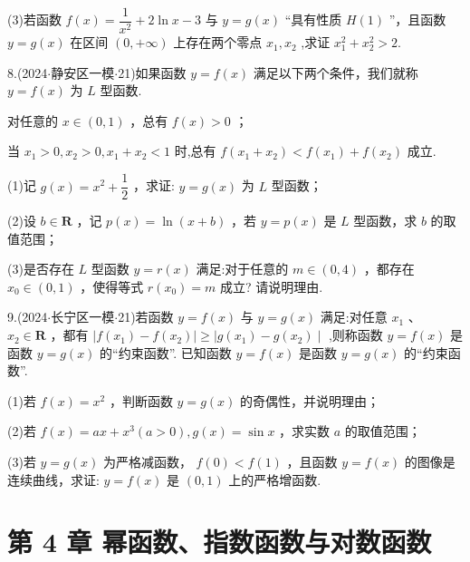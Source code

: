 (3)若函数 $f\left( x\right)  = \dfrac{1}{{x}^{2}} + {2\ln }x - 3$ 与 $y = g\left( x\right)$ “具有性质 $H\left( 1\right)$ ”，且函数 $y = g\left( x\right)$ 在区间 $\left( {0, + \infty }\right)$ 上存在两个零点 ${x}_{1},{x}_{2}$ ,求证 ${x}_{1}^{2} + {x}_{2}^{2} > 2$.

8.(2024$\cdot$静安区一模$\cdot$21)如果函数 $y = f\left( x\right)$ 满足以下两个条件，我们就称 $y = f\left( x\right)$ 为 $L$ 型函数.

   对任意的 $x \in  \left( {0,1}\right)$ ，总有 $f\left( x\right)  > 0$ ；

   当 ${x}_{1} > 0,{x}_{2} > 0,{x}_{1} + {x}_{2} < 1$ 时,总有 $f\left( {{x}_{1} + {x}_{2}}\right)  < f\left( {x}_{1}\right)  + f\left( {x}_{2}\right)$ 成立.

(1)记 $g\left( x\right)  = {x}^{2} + \dfrac{1}{2}$ ，求证: $y = g\left( x\right)$ 为 $L$ 型函数；

(2)设 $b \in  \mathbf{R}$ ，记 $p\left( x\right)  = \ln \left( {x + b}\right)$ ，若 $y = p\left( x\right)$ 是 $L$ 型函数，求 $b$ 的取值范围；

(3)是否存在 $L$ 型函数 $y = r\left( x\right)$ 满足:对于任意的 $m \in  \left( {0,4}\right)$ ，都存在 ${x}_{0} \in  \left( {0,1}\right)$ ，使得等式 $r\left( {x}_{0}\right)  = m$ 成立? 请说明理由.

9.(2024$\cdot$长宁区一模$\cdot$21)若函数 $y = f\left( x\right)$ 与 $y = g\left( x\right)$ 满足:对任意 ${x}_{1}$ 、 ${x}_{2} \in  \mathbf{R}$ ，都有 $\mid  f\left( {x}_{1}\right)  -  f\left( {x}_{2}\right) \left|  \geq  \right| g\left( {x}_{1}\right)  - g\left( {x}_{2}\right)  \mid$ ,则称函数 $y = f\left( x\right)$ 是函数 $y = g\left( x\right)$ 的“约束函数”. 已知函数 $y =  f\left( x\right)$ 是函数 $y = g\left( x\right)$ 的“约束函数”.

(1)若 $f\left( x\right)  = {x}^{2}$ ，判断函数 $y = g\left( x\right)$ 的奇偶性，并说明理由；

(2)若 $f\left( x\right)  = {ax} + {x}^{3}\left( {a > 0}\right) ,g\left( x\right)  = \sin x$ ，求实数 $a$ 的取值范围；

(3)若 $y = g\left( x\right)$ 为严格减函数， $f\left( 0\right)  < f\left( 1\right)$ ，且函数 $y = f\left( x\right)$ 的图像是连续曲线，求证: $y =  f\left( x\right)$ 是 $\left( {0,1}\right)$ 上的严格增函数.

\section*{第 4 章 幂函数、指数函数与对数函数}

